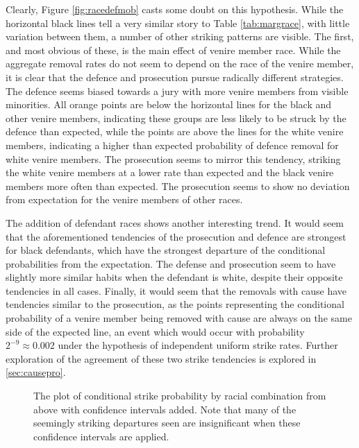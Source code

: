 Clearly, Figure \ref{fig:racedefmob} casts some doubt on this hypothesis. While the horizontal black lines tell a very similar
story to Table \ref{tab:margrace}, with little variation between them, a number of other striking patterns are visible. The first,
and most obvious of these, is the main effect of venire member race. While the aggregate removal rates do not seem to depend on
the race of the venire member, it is clear that the defence and prosecution pursue radically different strategies. The defence
seems biased towards a jury with more venire members from visible minorities. All orange points are below the horizontal lines for
the black and other venire members, indicating these groups are less likely to be struck by the defence than expected, while the
points are above the lines for the white venire members, indicating a higher than expected probability of defence removal for
white venire members. The prosecution seems to mirror this tendency, striking the white venire members at a lower rate than
expected and the black venire members more often than expected. The prosecution seems to show no deviation from expectation for
the venire members of other races.

The addition of defendant races shows another interesting trend. It would seem that the aforementioned tendencies of the
prosecution and defence are strongest for black defendants, which have the strongest departure of the conditional probabilities
from the expectation. The defense and prosecution seem to have slightly more similar habits when the defendant is white, despite
their opposite tendencies in all cases. Finally, it would seem that the removals with cause have tendencies similar to the
prosecution, as the points representing the conditional probability of a venire member being removed with cause are always on the
same side of the expected line, an event which would occur with probability $2^{-9} \approx 0.002$ under the hypothesis of
independent uniform strike rates. Further exploration of the agreement of these two strike tendencies is explored in
\ref{sec:causepro}.

\begin{figure}[h!]
  \centering
  \caption[Racial Combination and Strikes with Confidence
  Intervals (Sunsine)]{\footnotesize The plot of conditional strike probability by racial
    combination from above with confidence intervals added. Note that many of the seemingly striking departures seen are
    insignificant when these confidence intervals are applied.}
  \label{fig:racedefci}
\end{figure}

